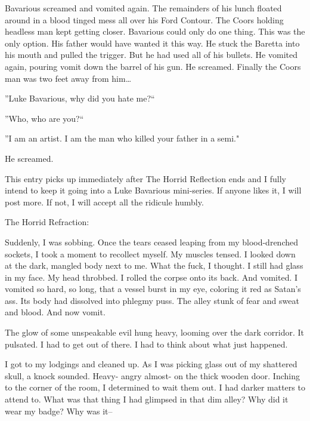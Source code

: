 Bavarious screamed and vomited again. The remainders of his lunch
floated around in a blood tinged mess all over his Ford Contour.
The Coors holding headless man kept getting closer. Bavarious could
only do one thing. This was the only option. His father would have
wanted it this way. He stuck the Baretta into his mouth and pulled
the trigger. But he had used all of his bullets. He vomited again,
pouring vomit down the barrel of his gun. He screamed. Finally the
Coors man was two feet away from him{\ldots}



''Luke Bavarious, why did you hate me?``

''Who, who are you?``

''I am an artist. I am the man who killed your father in a
semi."

He screamed. 
 





This entry picks up immediately after The Horrid Reflection ends
and I fully intend to keep it going into a Luke Bavarious
mini-series. If anyone likes it, I will post more. If not, I will
accept all the ridicule humbly.



The Horrid Refraction:



Suddenly, I was sobbing. Once the tears ceased leaping from my
blood-drenched sockets, I took a moment to recollect myself. My
muscles tensed. I looked down at the dark, mangled body next to me.
What the fuck, I thought. I still had glass in my face. My head
throbbed. I rolled the corpse onto its back. And vomited. I vomited
so hard, so long, that a vessel burst in my eye, coloring it red as
Satan's ass. Its body had dissolved into phlegmy puss. The alley
stunk of fear and sweat and blood. And now vomit.

The glow of some unspeakable evil hung heavy, looming over the dark
corridor. It pulsated. I had to get out of there. I had to think
about what just happened.

I got to my lodgings and cleaned up. As I was picking glass out of
my shattered skull, a knock sounded. Heavy- angry almost- on the
thick wooden door. Inching to the corner of the room, I determined
to wait them out. I had darker matters to attend to. What was that
thing I had glimpsed in that dim alley? Why did it wear my badge?
Why was it--


